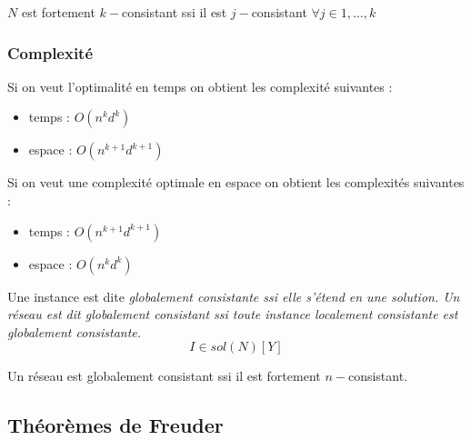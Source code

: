 \documentclass[a4paper,11pt]{thesis}
\begin{document}
\begin{df}
    $N$ est fortement $k-$consistant ssi il est $j-$consistant $\forall j \in 1, \dots, k$
\end{df}

\subsubsection*{Complexité}

Si on veut l'optimalité en temps on obtient les complexité suivantes :
\begin{itemize}
    \item temps : $O(n^kd^k)$
    \item espace : $O(n^{k+1}d^{k+1})$
\end{itemize}
Si on veut une complexité optimale en espace on obtient les complexités suivantes :
\begin{itemize}
    \item temps : $O(n^{k+1}d^{k+1})$
    \item espace : $O(n^kd^k)$
\end{itemize}

\begin{df}
    Une instance est dite \em{globalement consistante} ssi elle s'étend en une solution. Un réseau est
    dit \em{globalement consistant} ssi toute instance localement consistante est globalement
    consistante.
    \begin{displaymath} I \in sol(N)[Y] \end{displaymath}
\end{df}

\begin{prop}
    Un réseau est globalement consistant ssi il est fortement $n-$consistant.
\end{prop}

\subsection{Théorèmes de Freuder}
\end{document}
